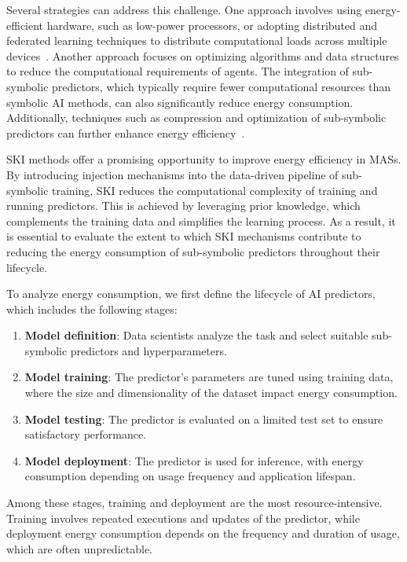 %
Several strategies can address this challenge.
%
One approach involves using energy-efficient hardware, such as low-power processors, or adopting distributed and federated learning techniques to distribute computational loads across multiple devices~\cite{CITATION}.
%
Another approach focuses on optimizing algorithms and data structures to reduce the computational requirements of agents.
%
The integration of sub-symbolic predictors, which typically require fewer computational resources than symbolic \gls{AI} methods, can also significantly reduce energy consumption.
%
Additionally, techniques such as compression and optimization of sub-symbolic predictors can further enhance energy efficiency~\cite{CITATION}.

%
\gls{SKI} methods offer a promising opportunity to improve energy efficiency in \glspl{MAS}.
%
By introducing injection mechanisms into the data-driven pipeline of sub-symbolic training, \gls{SKI} reduces the computational complexity of training and running predictors.
%
This is achieved by leveraging prior knowledge, which complements the training data and simplifies the learning process.
%
As a result, it is essential to evaluate the extent to which \gls{SKI} mechanisms contribute to reducing the energy consumption of sub-symbolic predictors throughout their lifecycle.

%
To analyze energy consumption, we first define the lifecycle of \gls{AI} predictors, which includes the following stages:
%
\begin{enumerate}
    \item \textbf{Model definition}: Data scientists analyze the task and select suitable sub-symbolic predictors and hyperparameters.
    \item \textbf{Model training}: The predictor's parameters are tuned using training data, where the size and dimensionality of the dataset impact energy consumption.
    \item \textbf{Model testing}: The predictor is evaluated on a limited test set to ensure satisfactory performance.
    \item \textbf{Model deployment}: The predictor is used for inference, with energy consumption depending on usage frequency and application lifespan.
\end{enumerate}

%
Among these stages, training and deployment are the most resource-intensive.
%
Training involves repeated executions and updates of the predictor, while deployment energy consumption depends on the frequency and duration of usage, which are often unpredictable.

